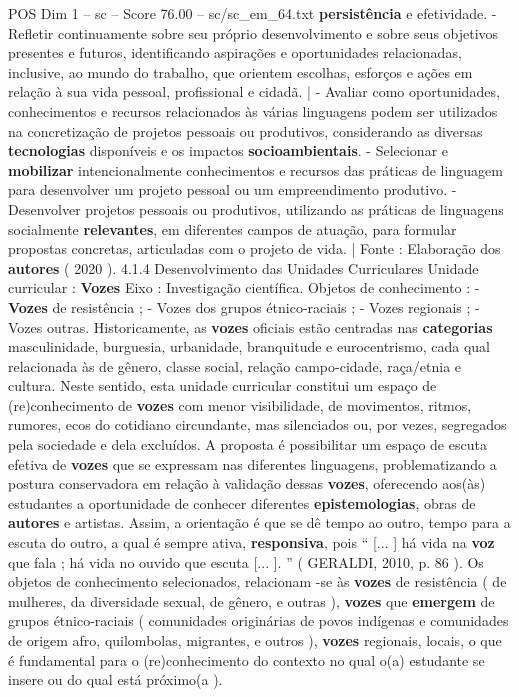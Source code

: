 \begin{textsample}{POS Dim 1 – sc – Score 76.00 – sc/sc\_em\_64.txt}
\textbf{persistência} e efetividade. - Refletir continuamente sobre seu próprio desenvolvimento e sobre seus objetivos presentes e futuros, identificando aspirações e oportunidades relacionadas, inclusive, ao mundo do trabalho, que orientem escolhas, esforços e ações em relação à sua vida pessoal, profissional e cidadã. | - Avaliar como oportunidades, conhecimentos e recursos relacionados às várias linguagens podem ser utilizados na concretização de projetos pessoais ou produtivos, considerando as diversas \textbf{tecnologias} disponíveis e os impactos \textbf{socioambientais}. - Selecionar e \textbf{mobilizar} intencionalmente conhecimentos e recursos das práticas de linguagem para desenvolver um projeto pessoal ou um empreendimento produtivo. - Desenvolver projetos pessoais ou produtivos, utilizando as práticas de linguagens socialmente \textbf{relevantes}, em diferentes campos de atuação, para formular propostas concretas, articuladas com o projeto de vida. | Fonte : Elaboração dos \textbf{autores} ( 2020 ). 4.1.4 Desenvolvimento das Unidades Curriculares Unidade curricular : \textbf{Vozes} Eixo : Investigação científica.
Objetos de conhecimento : - \textbf{Vozes} de resistência ; - Vozes dos grupos étnico-raciais ; - Vozes regionais ; - Vozes outras.
Historicamente, as \textbf{vozes} oficiais estão centradas nas \textbf{categorias} masculinidade, burguesia, urbanidade, branquitude e eurocentrismo, cada qual relacionada às de gênero, classe social, relação campo-cidade, raça/etnia e cultura.
Neste sentido, esta unidade curricular constitui um espaço de (re)conhecimento de \textbf{vozes} com menor visibilidade, de movimentos, ritmos, rumores, ecos do cotidiano circundante, mas silenciados ou, por vezes, segregados pela sociedade e dela excluídos.
A proposta é possibilitar um espaço de escuta efetiva de \textbf{vozes} que se expressam nas diferentes linguagens, problematizando a postura conservadora em relação à validação dessas \textbf{vozes}, oferecendo aos(às) estudantes a oportunidade de conhecer diferentes \textbf{epistemologias}, obras de \textbf{autores} e artistas.
Assim, a orientação é que se dê tempo ao outro, tempo para a escuta do outro, a qual é sempre ativa, \textbf{responsiva}, pois “ [... ] há vida na \textbf{voz} que fala ; há vida no ouvido que escuta [... ]. ” ( GERALDI, 2010, p. 86 ).
Os objetos de conhecimento selecionados, relacionam -se às \textbf{vozes} de resistência ( de mulheres, da diversidade sexual, de gênero, e outras ), \textbf{vozes} que \textbf{emergem} de grupos étnico-raciais ( comunidades originárias de povos indígenas e comunidades de origem afro, quilombolas, migrantes, e outros ), \textbf{vozes} regionais, locais, o que é fundamental para o (re)conhecimento do contexto no qual o(a) estudante se insere ou do qual está próximo(a ).

\end{textsample}
